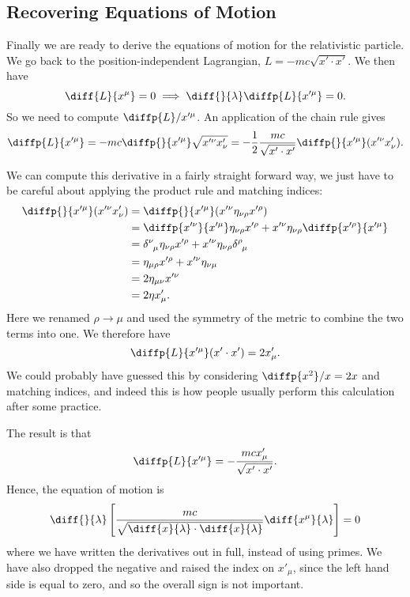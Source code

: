 \documentclass[fleqn]{NotesClass}
\newcommand*{\lagrangian}{L}
\begin{document}
    \subsection{Recovering Equations of Motion}
    Finally we are ready to derive the equations of motion for the relativistic particle.
    We go back to the position-independent Lagrangian, \(\lagrangian = -mc\sqrt{x'\cdot x'}\).
    We then have
    \begin{equation}
        \diff{\lagrangian}{x^\mu} = 0 \implies \diff{}{\lambda} \diffp{\lagrangian}{x'^\mu} = 0.
    \end{equation}
    So we need to compute \(\diffp{\lagrangian}/{x'^\mu}\).
    An application of the chain rule gives
    \begin{equation}
        \diffp{\lagrangian}{x'^\mu} = -mc \diffp{}{x'^\mu} \sqrt{x'^\nu x'_\nu} = -\frac{1}{2}\frac{mc}{\sqrt{x'\cdot x'}} \diffp{}{x'^\mu}(x'^\nu x'_\nu).
    \end{equation}

    We can compute this derivative in a fairly straight forward way, we just have to be careful about applying the product rule and matching indices:
    \begin{align}
        \diffp{}{x'^\mu}(x'^\nu x'_\nu) &= \diffp{}{x'^\mu} (x'^\nu \eta_{\nu\rho} x'^\rho)\\
        &= \diffp{x'^\nu}{x'^\mu} \eta_{\nu\rho} x'^\rho + x'^\nu \eta_{\nu\rho} \diffp{x'^\rho}{x'^\mu}\\
        &= \tensor{\delta}{^\nu_\mu} \eta_{\nu\rho} x'^\rho + x'^\nu \eta_{\nu\rho} \tensor{\delta}{^\rho_\mu}\\
        &= \eta_{\mu\rho} x'^\rho + x'^\nu \eta_{\nu\mu}\\
        &= 2\eta_{\mu\nu} x'^\nu\\
        &= 2\eta x'_\mu.
    \end{align}
    Here we renamed \(\rho \to \mu\) and used the symmetry of the metric to combine the two terms into one.
    We therefore have
    \begin{equation}
        \diffp{\lagrangian}{x'^\mu} (x'\cdot x') = 2x'_\mu.
    \end{equation}
    We could probably have guessed this by considering \(\diffp{x^2}/{x} = 2x\) and matching indices, and indeed this is how people usually perform this calculation after some practice.
    
    The result is that
    \begin{equation}
        \diffp{\lagrangian}{x'^\mu} = -\frac{mc x'_\mu}{\sqrt{x'\cdot x'}}.
    \end{equation}
    Hence, the equation of motion is
    \begin{equation}
        \diff{}{\lambda}\left[ \frac{mc}{\sqrt{\diff{x}{\lambda} \cdot \diff{x}{\lambda}}} \diff{x^\mu}{\lambda} \right] = 0
    \end{equation}
    where we have written the derivatives out in full, instead of using primes.
    We have also dropped the negative and raised the index on \(x'_\mu\), since the left hand side is equal to zero, and so the overall sign is not important.
    
\end{document}
